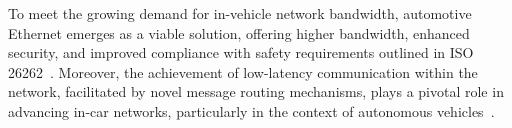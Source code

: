     To meet the growing demand for in-vehicle network bandwidth, automotive Ethernet emerges as a viable solution, offering higher bandwidth, enhanced security, and improved compliance with safety requirements outlined in ISO 26262~\cite{iso26262}. Moreover, the achievement of low-latency communication within the network, facilitated by novel message routing mechanisms, plays a pivotal role in advancing in-car networks, particularly in the context of autonomous vehicles~\cite{askaripoor2022architecture}. 
    
    
    
    
    
